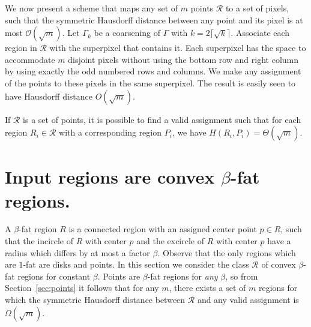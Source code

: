 \documentclass[a4paper,UKenglish,cleveref]{lipics-v2019}
\begin{document}
We now present a scheme that maps any set of $m$ points $\mathcal{R}$ to a set of pixels, such that the symmetric Hausdorff distance between any point and its pixel is at most $\mathcal{O}(\sqrt{m})$. Let $\Gamma_k$ be a coarsening of $\Gamma$ with $k=2\lceil \sqrt{k}\rceil$. Associate each region in 
$\mathcal{R}$ with the superpixel that contains it. Each superpixel has the space to accommodate $m$ disjoint pixels without using the bottom row and right column by using exactly the odd numbered rows and columns. We make any assignment of the points to these pixels in the same superpixel. The result is easily seen to have Hausdorff distance $O(\sqrt{m})$.


\begin{theorem}
If $\mathcal{R}$ is a set of points, it is possible to find a valid assignment such that for each region $R_i \in \mathcal{R}$ with a corresponding region $P_i$, we have $H(R_i, P_i) = \Theta(\sqrt{m})$.
\end{theorem}

\section{Input regions are convex $\beta$-fat regions.}
\label{sec:fat}

A $\beta$-fat region $R$ is a connected region with an assigned center point $p \in R$, such that the incircle of $R$ with center $p$ and the excircle of $R$ with center $p$ have a radius which differs by at most a factor $\beta$. Observe that the only regions which are $1$-fat are disks and points. In this section we consider the class $\mathcal{R}$ of convex $\beta$-fat regions for constant $\beta$. Points are $\beta$-fat regions for \emph{any} $\beta$, so from Section~\ref{sec:points} it follows that for any $m$, there exists a set of $m$ regions for which the symmetric Hausdorff distance between $\mathcal{R}$ and any valid assignment is $\Omega(\sqrt{m})$.
\end{document}
